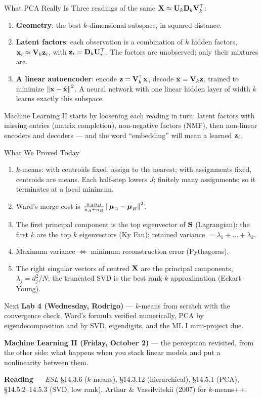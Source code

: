 \documentclass[11pt,aspectratio=169]{beamer}
\begin{document}
\begin{frame}{What PCA Really Is}
Three readings of the same $\mathbf{X}\approx\mathbf{U}_k\mathbf{D}_k\mathbf{V}_k^{\top}$:
\begin{enumerate}
  \item \textbf{Geometry}: the best $k$-dimensional subspace, in squared distance.
  \item \textbf{Latent factors}: each observation is a combination of $k$ hidden factors, $\mathbf{x}_i\approx\mathbf{V}_k\mathbf{z}_i$, with
        $\mathbf{z}_i=\mathbf{D}_k\mathbf{U}_{i\cdot}^{\top}$. The factors are unobserved; only their mixtures are.
  \item \textbf{A linear autoencoder}: encode $\mathbf{z}=\mathbf{V}_k^{\top}\mathbf{x}$, decode $\hat{\mathbf{x}}=\mathbf{V}_k\mathbf{z}$, trained to minimize $\left\lVert \mathbf{x}-\hat{\mathbf{x}} \right\rVert^2$.
        A neural network with one linear hidden layer of width $k$ learns exactly this subspace.
\end{enumerate}
\vspace{6pt}
Machine Learning II starts by loosening each reading in turn: latent factors with missing entries
(matrix completion), non-negative factors (NMF), then non-linear encoders and decoders --- and the word
``embedding'' will mean a learned $\mathbf{z}_i$.
\end{frame}

\begin{frame}{What We Proved Today}
\begin{enumerate}
  \item $k$-means: with centroids fixed, assign to the nearest; with assignments fixed, centroids are means.
        Each half-step lowers $J$; finitely many assignments; so it terminates at a local minimum.
  \item Ward's merge cost is $\frac{n_An_B}{n_A+n_B}\left\lVert \boldsymbol{\mu}_A-\boldsymbol{\mu}_B \right\rVert^2$.
  \item The first principal component is the top eigenvector of $\mathbf{S}$ (Lagrangian); the first $k$ are the top $k$
        eigenvectors (Ky Fan); retained variance $=\lambda_1+\dots+\lambda_k$.
  \item Maximum variance $\Leftrightarrow$ minimum reconstruction error (Pythagoras).
  \item The right singular vectors of centred $\mathbf{X}$ are the principal components, $\lambda_j=d_j^2/N$;
        the truncated SVD is the best rank-$k$ approximation (Eckart--Young).
\end{enumerate}
\end{frame}

\begin{frame}{Next}
\textbf{Lab 4 (Wednesday, Rodrigo)} --- $k$-means from scratch with the convergence check, Ward's formula
verified numerically, PCA by eigendecomposition and by SVD, eigendigits, and the ML I mini-project due.
\vspace{8pt}

\textbf{Machine Learning II (Friday, October 2)} --- the perceptron revisited, from the other side:
what happens when you stack linear models and put a nonlinearity between them.
\vspace{8pt}

\textbf{Reading} --- \emph{ESL} \S14.3.6 ($k$-means), \S14.3.12 (hierarchical), \S14.5.1 (PCA),
\S14.5.2--14.5.3 (SVD, low rank). Arthur \& Vassilvitskii (2007) for $k$-means++.
\end{frame}
\end{document}
